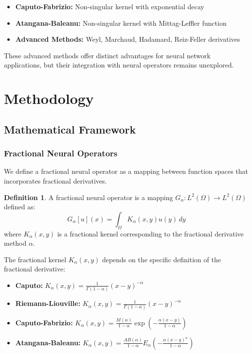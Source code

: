 \documentclass[12pt,a4paper]{article}
\theoremstyle{definition}
\newtheorem{definition}{Definition}
\begin{document}
\begin{itemize}
    \item \textbf{Caputo-Fabrizio:} Non-singular kernel with exponential decay \citep{caputo2015new}
    \item \textbf{Atangana-Baleanu:} Non-singular kernel with Mittag-Leffler function \citep{atangana2016new}
    \item \textbf{Advanced Methods:} Weyl, Marchaud, Hadamard, Reiz-Feller derivatives \citep{weyl1917ausdehnung,marchaud1927sur}
\end{itemize}

These advanced methods offer distinct advantages for neural network applications, but their integration with neural operators remains unexplored.

\section{Methodology}
\label{sec:methodology}

\subsection{Mathematical Framework}

\subsubsection{Fractional Neural Operators}

We define a fractional neural operator as a mapping between function spaces that incorporates fractional derivatives.

\begin{definition}
A fractional neural operator is a mapping $G_\alpha: L^2(\Omega) \to L^2(\Omega)$ defined as:
$$G_\alpha[u](x) = \int_\Omega K_\alpha(x,y) u(y) \, dy$$
where $K_\alpha(x,y)$ is a fractional kernel corresponding to the fractional derivative method $\alpha$.
\end{definition}

The fractional kernel $K_\alpha(x,y)$ depends on the specific definition of the fractional derivative:

\begin{itemize}
    \item \textbf{Caputo:} $K_\alpha(x,y) = \frac{1}{\Gamma(1-\alpha)} (x-y)^{-\alpha}$
    \item \textbf{Riemann-Liouville:} $K_\alpha(x,y) = \frac{1}{\Gamma(1-\alpha)} (x-y)^{-\alpha}$
    \item \textbf{Caputo-Fabrizio:} $K_\alpha(x,y) = \frac{M(\alpha)}{1-\alpha} \exp\left(-\frac{\alpha(x-y)}{1-\alpha}\right)$
    \item \textbf{Atangana-Baleanu:} $K_\alpha(x,y) = \frac{AB(\alpha)}{1-\alpha} E_\alpha\left(-\frac{\alpha(x-y)^\alpha}{1-\alpha}\right)$
\end{itemize}
\end{document}
